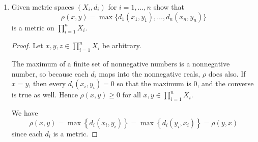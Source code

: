 \documentclass[11pt]{article}
\newcommand{\cbr}[1]{\left\{#1\right\}}
\begin{document}
\begin{enumerate}
\begin{enumerate}[label=(\alph*)]
\begin{proof}
        Since $X$ is a metric space, pick $U = B_d(x,\varepsilon/4)$ and $V = B_d(y,\varepsilon/4)$. Then for any $x^{\prime}\in U$ and $y^{\prime}\in V$, we have by the triangle inequality that \[d(x^{\prime}, y^{\prime})\leq d(x^{\prime}, x) + d(x,y) + d(y,y^{\prime}) < c +\varepsilon/2< b\] and \[a < c-\varepsilon/2 = d(x,y) - \varepsilon/4 - \varepsilon/4 \leq d(x^{\prime}, y^{\prime}) + (d(x^{\prime}, x) - \varepsilon/4)) + (d(y,y^{\prime}) - \varepsilon/4) < d(x^{\prime}, y^{\prime}),\] where in the last inequality we used the fact that both $(d(x^{\prime}, x) - \varepsilon/4)) , (d(y,y^{\prime}) - \varepsilon/4) < 0$. It follows that $d(x^{\prime}, y^{\prime})\in (a,b)$, so that $d(U\times V)\subset (a,b)$ as desired. Hence $d$ is continuous.
      \end{proof}
      \item If the sequences $x_n\to x$ and $y_n\to y$ converge in $X$ show that the sequence of real numbers $d(x_n,y_n)\to d(x,y)$.
      \begin{proof}
       Let $x_n\to x$ and $y_n\to y$ be convergent sequences in $X$ as given.
       
       Since $d$ is continuous, for every convergent sequence $\underline{x}_n\to \underline{x}$ of $X\times X$, the sequence $d(\underline{x}_n)\to d(\underline{x})$. All that is required to show is that the sequence $\underline{x}_n = (x_n, y_n)$ converges to $\underline{x} = (x,y)$. From a previous problem (note the box and product topologies agree for finite-product product spaces) we know that this must be true since the component sequences are convergent.

       Hence $d(x_n,y_n)\to d(x,y)$.
      \end{proof}
    \end{enumerate}
    \item Given metric spaces $(X_i, d_i)$ for $i = 1,\dots,n$ show that \[\rho(x,y) = \max\{d_1(x_1,y_1),\dots,d_n(x_n,y_n)\}\] is a metric on $\prod_{i=1}^n X_i$.
    \begin{proof}
      Let $x,y,z\in \prod_{i=1}^n X_i$ be arbitrary.

      The maximum of a finite set of nonnegative numbers is a nonnegative number, so because each $d_i$ maps into the nonnegative reals, $\rho$ does also. If $x = y$, then every $d_i(x_i,y_i) = 0$ so that the maximum is $0$, and the converse is true as well. Hence $\rho(x,y)\geq 0$ for all $x,y\in \prod_{i=1}^n X_i$.

      We have \[\rho(x,y) = \max\cbr{d_i(x_i,y_i)} = \max\cbr{d_i(y_i,x_i)} = \rho(y,x)\] since each $d_i$ is a metric.


\end{proof}
\end{enumerate}
\end{document}
